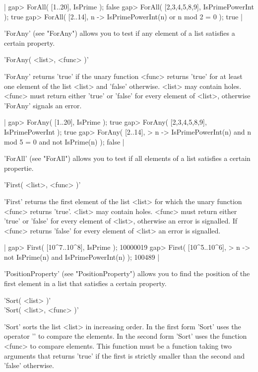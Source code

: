 |    gap> ForAll( [1..20], IsPrime );
    false
    gap> ForAll( [2,3,4,5,8,9], IsPrimePowerInt );
    true
    gap> ForAll( [2..14], n -> IsPrimePowerInt(n) or n mod 2 = 0 );
    true |

'ForAny'  (see "ForAny") allows  you  to test if  any  element  of a list
satisfies a certain property.


'ForAny( <list>, <func> )'

'ForAny' returns 'true' if the unary function  <func> returns 'true'  for
at  least one element of the list <list>  and 'false'  otherwise.  <list>
may contain holes.  <func> must return either 'true' or 'false' for every
element of <list>, otherwise 'ForAny' signals an error.

|    gap> ForAny( [1..20], IsPrime );
    true
    gap> ForAny( [2,3,4,5,8,9], IsPrimePowerInt );
    true
    gap> ForAny( [2..14],
    >    n -> IsPrimePowerInt(n) and n mod 5 = 0 and not IsPrime(n) );
    false |

'ForAll' (see "ForAll")  allows  you to test  if all  elements of  a list
satisfies a certain propertie.


'First( <list>, <func> )'

'First' returns the first element of the list <list> for which  the unary
function <func> returns 'true'.  <list>  may  contain holes.  <func> must
return either 'true' or 'false' for every element of <list>, otherwise an
error is  signalled.  If  <func> returns 'false'   for every element   of
<list> an error is signalled.

|    gap> First( [10^7..10^8], IsPrime );
    10000019
    gap> First( [10^5..10^6],
    >           n -> not IsPrime(n) and IsPrimePowerInt(n) );
    100489 |

'PositionProperty'   (see "PositionProperty") allows   you   to  find the
position of  the first  element  in a    list  that satisfies   a certain
property.

%

'Sort( <list> )' \\
'Sort( <list>, <func> )'

'Sort'  sorts the list <list> in increasing order. In the first form 'Sort'
uses  the operator '\<' to compare the  elements. In the second form 'Sort'
uses  the  function  <func>  to  compare  elements. This function must be a
function  taking two arguments that returns 'true' if the first is strictly
smaller than the second and 'false' otherwise.

